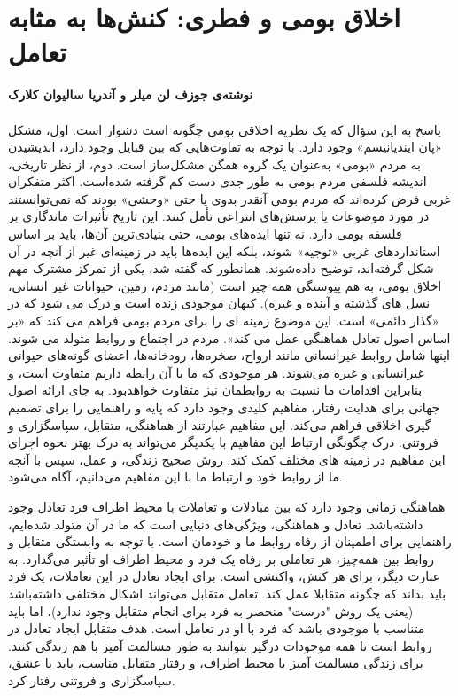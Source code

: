 \section*{اخلاق بومی و فطری: کنش‌ها به مثابه تعامل}
\label{sec:اخلاق بومی و فطری: کنش‌ها به مثابه تعامل}
\textbf{نوشته‌ی جوزف لن میلر و آندریا سالیوان کلارک}
\paragraph{}
پاسخ به این سؤال که یک نظریه اخلاقی بومی چگونه است دشوار است.
اول، مشکل «پان ایندیانیسم» وجود دارد.
با توجه به تفاوت‌هایی که بین قبایل وجود دارد، اندیشیدن به مردم «بومی» به‌عنوان یک گروه همگن مشکل‌ساز است.
دوم، از نظر تاریخی، اندیشه فلسفی مردم بومی به طور جدی دست کم گرفته شده‌است.
اکثر متفکران غربی فرض کرده‌اند که مردم بومی آنقدر بدوی یا حتی «وحشی» بودند که نمی‌توانستند در مورد موضوعات یا پرسش‌های انتزاعی تأمل کنند.
این تاریخ تأثیرات ماندگاری بر فلسفه بومی دارد.
نه تنها ایده‌های بومی، حتی بنیادی‌ترین آن‌ها، باید بر اساس استانداردهای غربی «توجیه» شوند، بلکه این ایده‌ها باید در زمینه‌ای غیر از آنچه در آن شکل گرفته‌اند، توضیح داده‌شوند.
همانطور که گفته شد، یکی از تمرکز مشترک مهم اخلاق بومی، به هم پیوستگی همه چیز است (مانند مردم، زمین، حیوانات غیر انسانی، نسل های گذشته و آینده و غیره).
کیهان موجودی زنده است و درک می شود که در «گذار دائمی» است.
این موضوع زمینه ای را برای مردم بومی فراهم می کند که «بر اساس اصول تعادل هماهنگی عمل می کند».
مردم در اجتماع و روابط متولد می شوند.
اینها شامل روابط غیرانسانی مانند ارواح، صخره‌ها، رودخانه‌ها، اعضای گونه‌های حیوانی غیرانسانی و غیره می‌شوند.
هر موجودی که ما با آن رابطه داریم متفاوت است، و بنابراین اقدامات ما نسبت به روابطمان نیز متفاوت خواهدبود.
به جای ارائه اصول جهانی برای هدایت رفتار، مفاهیم کلیدی وجود دارد که پایه و راهنمایی را برای تصمیم گیری اخلاقی فراهم می‌کند.
این مفاهیم عبارتند از هماهنگی، متقابل، سپاسگزاری و فروتنی.
درک چگونگی ارتباط این مفاهیم با یکدیگر می‌تواند به درک بهتر نحوه اجرای این مفاهیم در زمینه های مختلف کمک کند.
روش صحیح زندگی، و عمل، سپس با آنچه ما از روابط خود و ارتباط ما با این مفاهیم می‌دانیم، آگاه می‌شود.

هماهنگی زمانی وجود دارد که بین مبادلات و تعاملات با محیط اطراف فرد تعادل وجود داشته‌باشد.
تعادل و هماهنگی، ویژگی‌های دنیایی است که ما در آن متولد شده‌ایم، راهنمایی برای اطمینان از رفاه روابط ما و خودمان است.
با توجه به وابستگی متقابل و روابط بین همه‌چیز، هر تعاملی بر رفاه یک فرد و محیط اطراف او تأثیر می‌گذارد.
به عبارت دیگر، برای هر کنش، واکنشی است.
برای ایجاد تعادل در این تعاملات، یک فرد باید بداند که چگونه متقابلا عمل کند.
تعامل متقابل می‌تواند اشکال مختلفی داشته‌باشد (یعنی یک روش "درست" منحصر به فرد برای انجام متقابل وجود ندارد)، اما باید متناسب با موجودی باشد که فرد با او در تعامل است.
هدف متقابل ایجاد تعادل در روابط است تا همه موجودات درگیر بتوانند به طور مسالمت آمیز با هم زندگی کنند.
برای زندگی مسالمت آمیز با محیط اطراف، و رفتار متقابل مناسب، باید با عشق، سپاسگزاری و فروتنی رفتار کرد.

